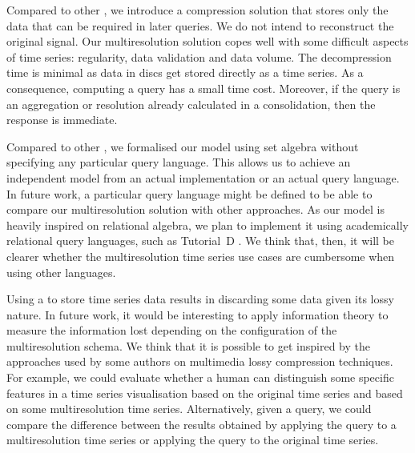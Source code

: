 Compared to other , we introduce a compression solution
that stores only the data that can be required in later queries. We do
not intend to reconstruct the original signal. Our multiresolution
solution copes well with some difficult aspects of time series:
regularity, data validation and data volume.  The decompression time
is minimal as data in discs get stored directly as a time series. As a
consequence, computing a query has a small time cost. Moreover, if the
query is an aggregation or resolution already calculated in a
 consolidation, then the response is immediate.


Compared to other , we formalised our model using set
algebra without specifying any particular query language.  This allows
us to achieve an independent model from an actual implementation or an
actual query language.  In future work, a particular query language
might be defined to be able to compare our multiresolution solution
with other approaches. As our model is heavily inspired on relational
algebra, we plan to implement it using academically relational query
languages, such as Tutorial~D \cite{date:introduction}.  We think
that, then, it will be clearer whether the multiresolution time series
use cases are cumbersome when using other languages.


Using a  to store time series data results in discarding
some data given its lossy nature.  In future work, it would be
interesting to apply information theory to measure the information
lost depending on the configuration of the multiresolution schema. We
think that it is possible to get inspired by the approaches used by
some authors on multimedia lossy compression techniques. For example,
we could evaluate whether a human can distinguish some specific
features in a time series visualisation based on the original time
series and based on some multiresolution time series. Alternatively,
given a query, we could compare the difference between the results
obtained by applying the query to a multiresolution time series or
applying the query to the original time series.








